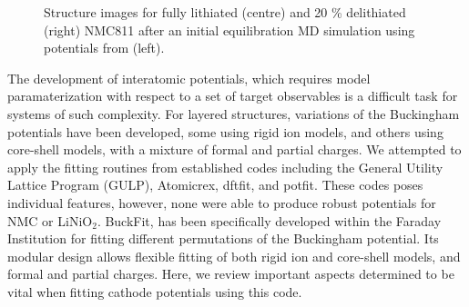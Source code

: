 \documentclass[journal=jacsat,manuscript=article]{achemso}
\begin{document}
\begin{figure}[h]
  \centering
    \caption{\label{fig:structure_collapse} Structure images for fully lithiated (centre) and 20 \% delithiated (right) NMC811 after an initial equilibration MD simulation using potentials from \citeauthor{Lee_and_Park_2012} (left). \cite{Lee_and_Park_2012} }
\end{figure}

The development of interatomic potentials, which requires model paramaterization with respect to a set of target observables is a difficult task for systems of such complexity.  
For layered structures, variations of the Buckingham potentials have been developed, some using rigid ion models,\cite{Lewis_1985, Ledwaba2020, Sayle2005, Dawson2014} and others using core-shell models, \cite{Hart1998, Fisher2010, Lewis_1985,Ammundsen1999, Kerisit2014, He2019,lee2012atomistic} with a mixture of formal and partial charges. 
We attempted to apply the fitting routines from established codes including  the General Utility Lattice Program (GULP), \cite{gale_gulp_1997} Atomicrex, \cite{Stukowski_2017} dftfit, \cite{dftfit} and potfit. \cite{wen_kim-compliant_2017} 
These codes poses individual features, however, none were able to produce robust potentials for NMC or LiNiO$_2$.
BuckFit,\cite{Morgan2020BuckFit} has been specifically developed within the Faraday Institution for fitting different permutations of the Buckingham potential. Its modular design allows flexible fitting of both rigid ion and core-shell models, and formal and partial charges. Here, we review important aspects determined to be vital when fitting cathode potentials using this code.
\end{document}

